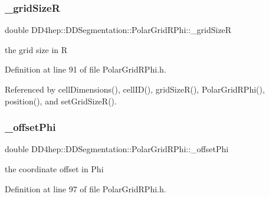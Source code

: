 \hypertarget{class_d_d4hep_1_1_d_d_segmentation_1_1_polar_grid_r_phi_a3f8b1d0889b592d5f6b08a27ef376c18}{}\label{class_d_d4hep_1_1_d_d_segmentation_1_1_polar_grid_r_phi_a3f8b1d0889b592d5f6b08a27ef376c18} 
\subsubsection{\texorpdfstring{\+\_\+grid\+SizeR}{\_gridSizeR}}
{\footnotesize\ttfamily double D\+D4hep\+::\+D\+D\+Segmentation\+::\+Polar\+Grid\+R\+Phi\+::\+\_\+grid\+SizeR\hspace{0.3cm}{\ttfamily [protected]}}



the grid size in R 



Definition at line 91 of file Polar\+Grid\+R\+Phi.\+h.



Referenced by cell\+Dimensions(), cell\+I\+D(), grid\+Size\+R(), Polar\+Grid\+R\+Phi(), position(), and set\+Grid\+Size\+R().

\hypertarget{class_d_d4hep_1_1_d_d_segmentation_1_1_polar_grid_r_phi_aad87313faf21c764d78f84130c87c178}{}\label{class_d_d4hep_1_1_d_d_segmentation_1_1_polar_grid_r_phi_aad87313faf21c764d78f84130c87c178} 
\subsubsection{\texorpdfstring{\+\_\+offset\+Phi}{\_offsetPhi}}
{\footnotesize\ttfamily double D\+D4hep\+::\+D\+D\+Segmentation\+::\+Polar\+Grid\+R\+Phi\+::\+\_\+offset\+Phi\hspace{0.3cm}{\ttfamily [protected]}}



the coordinate offset in Phi 



Definition at line 97 of file Polar\+Grid\+R\+Phi.\+h.



